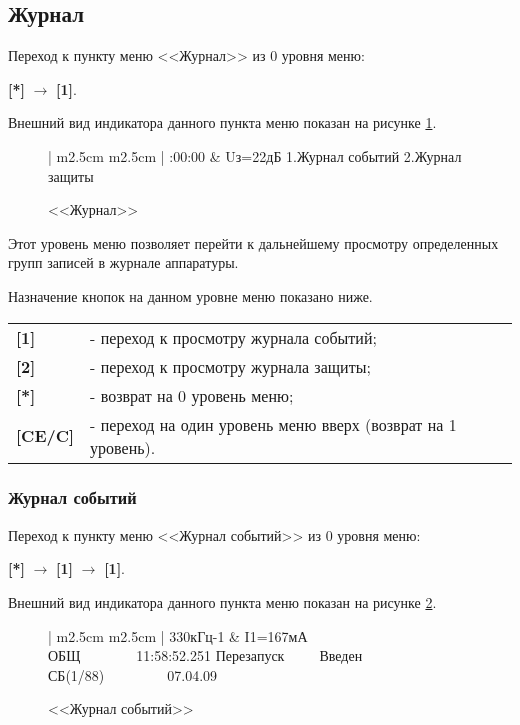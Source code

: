 \subsection{Журнал}

Переход к пункту меню <<Журнал>> из 0 уровня меню:

\textbf{[*]} $\rightarrow$ \textbf{[1]}.

Внешний вид индикатора данного пункта меню показан на рисунке \ref{fig:journal}.

 \begin{figure}[H]
 	\centering 
 	
	\begin{tabular}{| m{2.5cm}  m{2.5cm} |}
		:00:00	& \raggedleft Uз=22дБ		\tabularnewline
		 {1.Журнал событий} \tabularnewline
		 {2.Журнал защиты}	\tabularnewline
		 {} 				\tabularnewline
		\lasthline
	\end{tabular}

	\caption{<<Журнал>>}
	\label{fig:journal}
\end{figure}

Этот уровень меню позволяет перейти к дальнейшему просмотру определенных групп записей в журнале аппаратуры.

Назначение кнопок на данном уровне меню показано ниже.
\begin{center}
	\begin{tabular}{p{2cm} p{15cm}}
		\textbf{[1]} & - переход к просмотру журнала событий; \tabularnewline
		\textbf{[2]} & - переход к просмотру журнала защиты; \tabularnewline
		\textbf{[*]} & - возврат на 0 уровень меню; \tabularnewline
		\textbf{[CE/C]} & - переход на один уровень меню вверх (возврат на 1 уровень). \tabularnewline
	\end{tabular}
\end{center}

\subsubsection{Журнал событий}

Переход к пункту меню <<Журнал событий>> из 0 уровня меню: 

\textbf{[*]} $\rightarrow$ \textbf{[1]} $\rightarrow$ \textbf{[1]}.

Внешний вид индикатора данного пункта меню показан на рисунке \ref{fig:journal_event}.
 
 \begin{figure}[H]
 	\centering
 	
	\begin{tabular}{| m{2.5cm}  m{2.5cm} |}
		\firsthline
		330кГц-1	& \raggedleft I1=167мА				\tabularnewline 
		 {ОБЩ~~~~~~~~11:58:52.251} 	\tabularnewline
		  {Перезапуск~~~~~Введен} 	\tabularnewline 
		 {СБ(1/88)~~~~~~~~~07.04.09}\tabularnewline 
		\lasthline
	\end{tabular} 
	
	\caption{<<Журнал событий>>}
	\label{fig:journal_event}
\end{figure}

